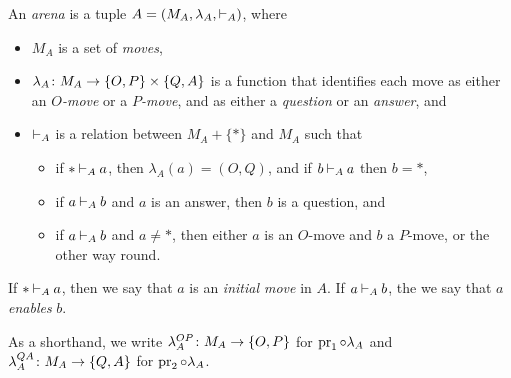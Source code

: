 \begin{definition}
  An \emph{arena} is a tuple $A=(M_A,\lambda_A,\mathbin{\vdash}_A)$, where
  \begin{itemize}
    \item $M_A$ is a set of \emph{moves},
    \item $\lambda_A \colon M_A \to \{O,P\} \times \{Q,A\}$ is a function that identifies each move as either an \emph{$O$-move} or a \emph{$P$-move}, and as either a \emph{question} or an \emph{answer}, and
    \item $\mathbin{\vdash}_A$ is a relation between $M_A+\{*\}$ and $M_A$ such that
      \begin{itemize}
        \item if $*\mathbin{\vdash}_A a$, then $\lambda_A(a)=(O,Q)$, and if $b\mathbin{\vdash}_A a$ then $b=*$,
        \item if $a\mathbin{\vdash}_A b$ and $a$ is an answer, then $b$ is a question, and
        \item if $a \mathbin{\vdash}_A b$ and $a\ne *$, then either $a$ is an $O$-move and $b$ a $P$-move, or the other way round.
      \end{itemize}
  \end{itemize}
  If $*\mathbin{\vdash}_A a$, then we say that $a$ is an \emph{initial move} in $A$.  
  If $a \mathbin{\vdash}_A b$, the we say that $a$ \emph{enables} $b$.
\end{definition}

As a shorthand, we write $\lambda_A^{OP}\colon M_A \to \{O,P\}$ for $\operatorname{pr}_1\circ\lambda_A$ and $\lambda_A^{QA}\colon M_A \to \{Q,A\}$ for $\operatorname{pr}_2\circ\lambda_A$.


